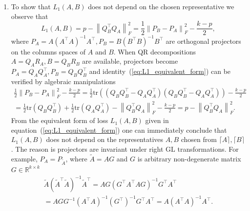 \documentclass{article}
\begin{document}
\begin{enumerate}
	\item
	To show that $L_1(A, B)$ does not depend on the chosen representative we observe that
	\begin{equation}
		\label{eq:L1_equivalent_form}
		L_1(A, B) = p - \left\|Q_{B}^\top Q_{A}\right\|_{F}^2 = \frac{1}{2}\left\|P_{B} - P_{A}\right\|_{F}^2 - \frac{k-p}{2},
	\end{equation}
	where $P_{A} = A\left(A^\top A\right)^{-1}A^\top, P_{B} = B\left(B^\top B\right)^{-1}B^\top$ are orthogonal projectors on the columns spaces of $A$ and $B$.
	When QR decompositions $A = Q_{A} R_{A}, B = Q_{B} R_{B}$ are available, projectors become $P_{A} = Q_{A}Q_{A}^\top, P_{B} = Q_{B}Q_{B}^\top$ and identity~(\ref{eq:L1_equivalent_form}) can be verified by algebraic manipulations
	\begin{multline}
		\frac{1}{2}\left\|P_{B} - P_{A}\right\|_{F}^2 - \frac{k-p}{2} = \frac{1}{2}\text{tr}\left(\left(Q_{B}Q_{B}^\top - Q_{A}Q_{A}^\top\right)\left(Q_{B}Q_{B}^\top - Q_{A}Q_{A}^\top\right)\right)  - \frac{k-p}{2}\\ = \frac{1}{2}\text{tr}\left(Q_{B}Q_{B}^\top\right) + \frac{1}{2}\text{tr}\left(Q_{A}Q_{A}^\top\right) - \left\|Q_{B}^\top Q_{A}\right\|_{F}^2 - \frac{k-p}{2} = p - \left\|Q_{B}^\top Q_{A}\right\|_{F}^2.
	\end{multline}
	From the equivalent form of loss $L_{1}(A, B)$ given in equation~(\ref{eq:L1_equivalent_form}) one can immediately conclude that $L_1(A, B)$ does not depend on the representatives $A, B$ chosen from $\lceil A\rceil, \lceil B\rceil$. The reason is projectors are invariant under right $\text{GL}$ transformations. For example, $P_{A} = P_{\widetilde{A}}$, where $\widetilde{A} = A G$ and $G$ is arbitrary non-degenerate matrix $G\in\mathbb{R}^{k\times k}$
	\begin{multline}
		\widetilde{A}\left(\widetilde{A}^\top \widetilde{A}\right)^{-1}\widetilde{A}^\top = A G \left(G^\top A^\top A G\right)^{-1} G^\top A^\top \\= A G G^{-1}\left(A^\top A\right)^{-1} \left(G^\top\right)^{-1}G^\top A^\top = A\left(A^\top A\right)^{-1}A^\top.
	\end{multline}
	

\end{enumerate}
\end{document}

